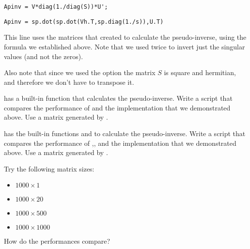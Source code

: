 \begin{matlab}
\begin{lstlisting}[style=matlab]
Apinv = V*diag(1./diag(S))*U';
\end{lstlisting}
\end{matlab}
\begin{python}
\begin{lstlisting}[style=python]
Apinv = sp.dot(sp.dot(Vh.T,sp.diag(1./s)),U.T)
\end{lstlisting}
\end{python}

This line uses the matrices that  created to calculate the pseudo-inverse, using the formula we established above. Note that we used  twice to invert just the singular values (and not the zeros). \begin{matlab}Also note that since we used the  option the matrix $S$ is square and hermitian, and therefore we don't have to transpose it.\end{matlab}%
\begin{problem}
\begin{matlab}
\ProgrammingLanguage has a built-in function that calculates the pseudo-inverse. Write a script that compares the performance of  and the implementation that we demonstrated above. Use a matrix generated by  .\end{matlab}
\begin{python}%
\ProgrammingLanguage has the built-in functions  and  to calculate the pseudo-inverse. Write a script that compares the performance of ,, and the implementation that we demonstrated above. Use a matrix generated by  .\end{python}
 Try the following matrix sizes:
\begin{itemize}
\item $1000 \times 1$
\item $1000 \times 20$
\item $1000 \times 500$
\item $1000 \times 1000$
\end{itemize}
How do the performances compare?
\end{problem}

